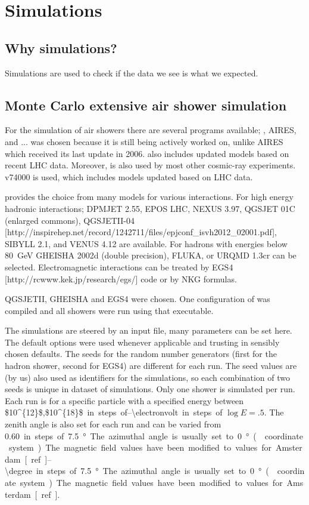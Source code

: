 \chapter{Simulations}
\label{ch:simulations}

\section{Why simulations?}

Simulations are used to check if the data we see is what we expected.



\section{Monte Carlo extensive air shower simulation}

For the simulation of air showers there are several programs available;
\corsika, AIRES, and ... \corsika was chosen because it is still being
actively worked on, unlike AIRES which received its last update in 2006.
\corsika also includes updated models based on recent LHC data.
Moreover, \corsika is also used by most other cosmic-ray experiments.
\corsika v74000 is used, which includes models updated based on LHC data.

\corsika provides the choice from many models for various interactions.
For high energy hadronic interactions; DPMJET 2.55, EPOS LHC, NEXUS
3.97, QGSJET 01C (enlarged commons), QGSJETII-04
[http://inspirehep.net/record/1242711/files/epjconf_isvh2012_02001.pdf],
SIBYLL 2.1, and VENUS 4.12 are available. For hadrons with energies
below \SI{80}{\giga\electronvolt} GHEISHA 2002d (double precision),
FLUKA, or URQMD 1.3cr can be selected. Electromagnetic interactions can
be treated by EGS4 [http://rcwww.kek.jp/research/egs/] code or by NKG
formulas.

QGSJETII, GHEISHA and EGS4 were chosen. One configuration of \corsika
was compiled and all showers were run using that executable.

The simulations are steered by an input file, many parameters can be set
here. The default options were used whenever applicable and trusting in
sensibly chosen defaults. The seeds for the random number generators
(first for the hadron shower, second for EGS4) are different for each
run. The seed values are (by us) also used as identifiers for the
simulations, so each combination of two seeds is unique in dataset of
simulations. Only one shower is simulated per run. Each run is for a
specific particle with a specified energy between
\SIrange{$10^{12}$,$10^{18}$}{\electronvolt} in steps of $\log E = .5$.
The zenith angle is also set for each run and can be varied from
\SIrange{0,60}{\degree} in steps of \SI{7.5}{\degree}. The azimuthal
angle is usually set to \SI{0}{\degree} (\hisparc coordinate system). 
The magnetic field values have been modified to values for Amsterdam [ref].

